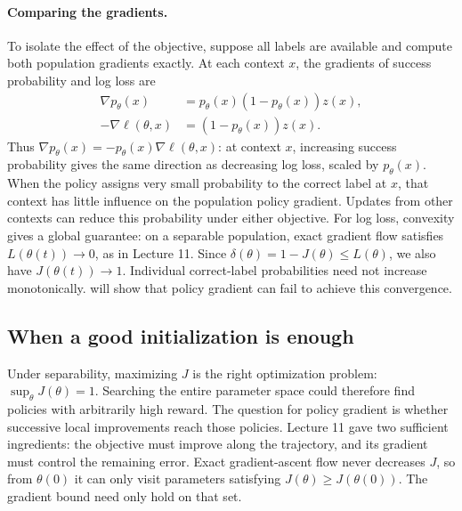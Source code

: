 \documentclass[11pt,twoside]{article}
\theoremstyle{definition}
\theoremstyle{remark}
\begin{document}
\paragraph{Comparing the gradients.}
To isolate the effect of the objective, suppose all labels are available
and compute both population gradients exactly. At each context $x$,
the gradients of success probability and log loss are
\begin{equation}
 \begin{aligned}
 \nabla p_\theta(x)&=p_\theta(x)(1-p_\theta(x))z(x),\\
 -\nabla\ell(\theta,x)&=(1-p_\theta(x))z(x).
 \end{aligned}
 \label{eq:classification-weights}
\end{equation}
Thus $\nabla p_\theta(x)=-p_\theta(x)\nabla\ell(\theta,x)$:
at context $x$, increasing success probability gives the same direction
as decreasing log loss, scaled by $p_\theta(x)$.
When the policy assigns very small probability to the correct label at
$x$, that context has little influence on the population policy gradient.
Updates from other contexts can reduce this probability under either
objective. For log loss, convexity gives a global guarantee: on a separable
population, exact gradient flow satisfies $L(\theta(t))\to0$, as in
Lecture 11. Since $\delta(\theta)=1-J(\theta)\le L(\theta)$, we also have
$J(\theta(t))\to1$. Individual correct-label probabilities need not
increase monotonically.  will show that policy gradient
can fail to achieve this convergence.

\subsection{When a good initialization is enough}
\label{sec:local-pg}

Under separability, maximizing $J$ is the right optimization problem:
$\sup_\theta J(\theta)=1$. Searching the entire parameter space could
therefore find policies with arbitrarily high reward. The question for
policy gradient is whether successive local improvements reach those
policies. Lecture 11 gave two sufficient ingredients: the objective must
improve along the trajectory, and its gradient must control the remaining
error. Exact gradient-ascent flow never decreases $J$, so from $\theta(0)$
it can only visit parameters satisfying $J(\theta)\ge J(\theta(0))$.
The gradient bound need only hold on that set.
\end{document}
